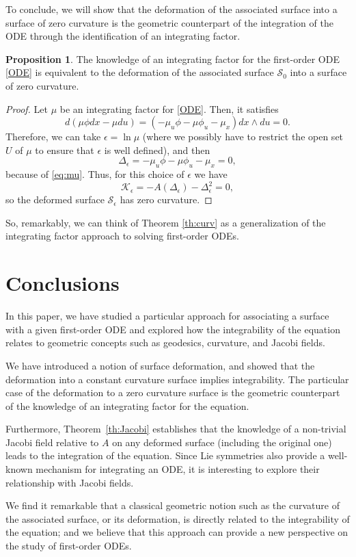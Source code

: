 \documentclass{article}
\theoremstyle{remark}
\theoremstyle{definition}
\newtheorem{proposition}[remark]{Proposition}
\begin{document}
To conclude, we will show that the deformation of the associated surface into a surface of zero curvature is the geometric counterpart of the integration of the ODE through the identification of an integrating factor.
\begin{proposition}
    The knowledge of an integrating factor for the first-order ODE \eqref{ODE} is equivalent to the deformation of the associated surface $\mathcal{S}_0$ into a surface of zero curvature.
\end{proposition}
\begin{proof}
Let $\mu$ be an integrating factor for \eqref{ODE}. Then, it satisfies
\begin{equation}\label{eq:mu}
    d(\mu \phi dx-\mu du)=(-\mu_u \phi-\mu \phi_u-\mu_x )dx \wedge du=0.   
\end{equation}
Therefore, we can take $\epsilon=\ln{\mu}$ (where we possibly have to restrict the open set $U$ of $\mu$ to ensure that $\epsilon$ is well defined), and then
$$
\Delta_{\epsilon}=-\mu_u \phi-\mu \phi_u-\mu_x=0,
$$
because of \eqref{eq:mu}. Thus, for this choice of $\epsilon$ we have
$$
\mathcal{K}_{\epsilon}=-A(\Delta_{\epsilon})-\Delta_{\epsilon}^2=0,
$$
so the deformed surface $\mathcal{S}_{\epsilon}$ has zero curvature.
\end{proof}

So, remarkably, we can think of Theorem \ref{th:curv} as a generalization of the integrating factor approach to solving first-order ODEs.



\section{Conclusions}
In this paper, we have studied a particular approach for associating a surface with a given first-order ODE and explored how the integrability of the equation relates to geometric concepts such as geodesics, curvature, and Jacobi fields. 

We have introduced a notion of surface deformation, and showed that the deformation into a constant curvature surface implies integrability. The particular case of the deformation to a zero curvature surface is the geometric counterpart of the knowledge of an integrating factor for the equation.

Furthermore, Theorem~\ref{th:Jacobi} establishes that the knowledge of a non-trivial Jacobi field relative to $A$ on any deformed surface (including the original one) leads to the integration of the equation. Since Lie symmetries also provide a well-known mechanism for integrating an ODE, it is interesting to explore their relationship with Jacobi fields. 

We find it remarkable that a classical geometric notion such as the curvature of the associated surface, or its deformation, is directly related to the integrability of the equation; and we believe that this approach can provide a new perspective on the study of first-order ODEs.
  

\end{document}
